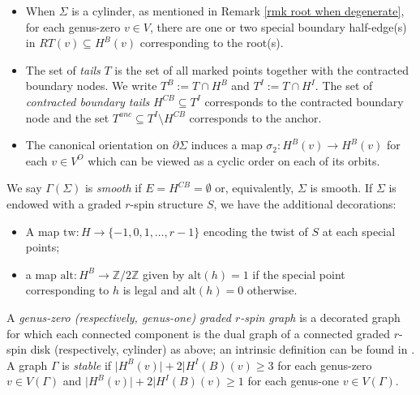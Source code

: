 \documentclass[11pt]{amsart}
\theoremstyle{definition}
\theoremstyle{remark}
\newcommand{\<}{\left<}
\renewcommand{\>}{\right>}
\numberwithin{equation}{section}
\begin{document}
\begin{itemize}
\item
When $\Sigma$ is a cylinder, as mentioned in Remark \ref{rmk root when degenerate}, for each genus-zero $v \in V$, there are one or two special boundary half-edge(s) in $RT(v)\subseteq H^B(v)$ corresponding to the root(s). 

\item The set of \textit{tails} $T$ is the set of all marked points together with the contracted boundary nodes. We write $T^B:=T\cap H^B$ and $T^I:=T\cap H^I$. The set of \textit{contracted boundary tails} $H^{CB}\subseteq T^I$ corresponds to the contracted boundary node and the set $T^{anc}\subseteq T^I\setminus H^{CB}$ corresponds to the anchor.
\item 
The canonical orientation on %
$\partial\Sigma$ induces a %
map $\sigma_2\colon H^B(v) \to H^B(v)$ for each %
$v\in V^O$ which %
can be viewed as a cyclic order on each of its orbits.
\end{itemize}
We say $\Gamma(\Sigma)$ is \textit{smooth} if %
$E = H^{CB} = \emptyset$ or, equivalently, %
$\Sigma$ is smooth.
If $\Sigma$ is endowed with a graded $r$-spin structure $S$, we have the additional %
decorations:
\begin{itemize}
    \item A map %
$\text{tw}: H \rightarrow \{-1,0,1,\ldots, r-1\}$ encoding the twist of $S$ at each special points;
    \item a map
$\text{alt}: H^B \rightarrow \mathbb{Z}/2\mathbb{Z}$
given by $\text{alt}(h) = 1$ if the special point corresponding to $h$ is legal and $\text{alt}(h) = 0$ otherwise.
\end{itemize}



A \textit{genus-zero (respectively, genus-one) graded $r$-spin graph} is a decorated graph for which each connected component is the dual graph of a connected graded $r$-spin disk (respectively, cylinder) as above; an intrinsic definition can be found in \cite[\S 3.2]{TZ1}. A graph $\Gamma$ is \textit{stable} if $\lvert H^B(v)\rvert +2\lvert H^I(B)(v)\ge 3$ for each genus-zero $v\in V(\Gamma)$ and $\lvert H^B(v)\rvert +2\lvert H^I(B)(v)\ge 1$ for each genus-one $v\in V(\Gamma)$.
\end{document}
